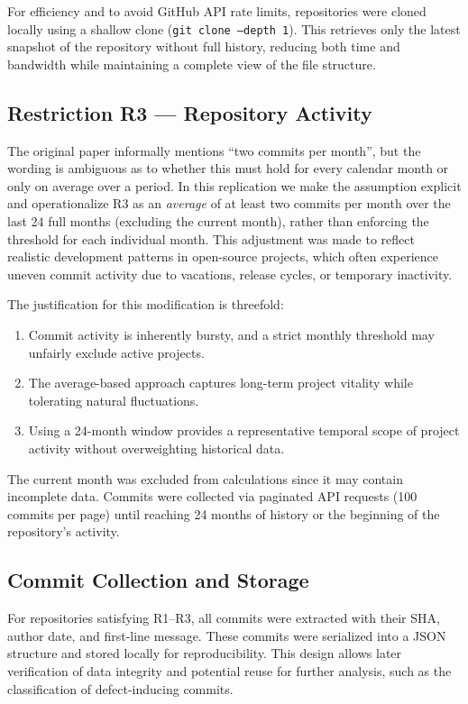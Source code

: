 \documentclass[conference]{IEEEtran}
\begin{document}
	For efficiency and to avoid GitHub API rate limits, repositories were cloned locally using a shallow clone (\texttt{git clone --depth 1}). This retrieves only the latest snapshot of the repository without full history, reducing both time and bandwidth while maintaining a complete view of the file structure.
	
	
	\subsection{Restriction R3 — Repository Activity}
	The original paper informally mentions ``two commits per month'', but the wording is ambiguous as to whether this must hold for every calendar month or only on average over a period. In this replication we make the assumption explicit and operationalize R3 as an \textit{average} of at least two commits per month over the last 24 full months (excluding the current month), rather than enforcing the threshold for each individual month. This adjustment was made to reflect realistic development patterns in open-source projects, which often experience uneven commit activity due to vacations, release cycles, or temporary inactivity.
	
	The justification for this modification is threefold:
	\begin{enumerate}
		\item Commit activity is inherently bursty, and a strict monthly threshold may unfairly exclude active projects.
		\item The average-based approach captures long-term project vitality while tolerating natural fluctuations.
		\item Using a 24-month window provides a representative temporal scope of project activity without overweighting historical data.
	\end{enumerate}
	
	The current month was excluded from calculations since it may contain incomplete data. Commits were collected via paginated API requests (100 commits per page) until reaching 24 months of history or the beginning of the repository's activity.
	
	\subsection{Commit Collection and Storage}
	For repositories satisfying R1–R3, all commits were extracted with their SHA, author date, and first-line message. These commits were serialized into a JSON structure and stored locally for reproducibility. This design allows later verification of data integrity and potential reuse for further analysis, such as the classification of defect-inducing commits.
	
\end{document}

